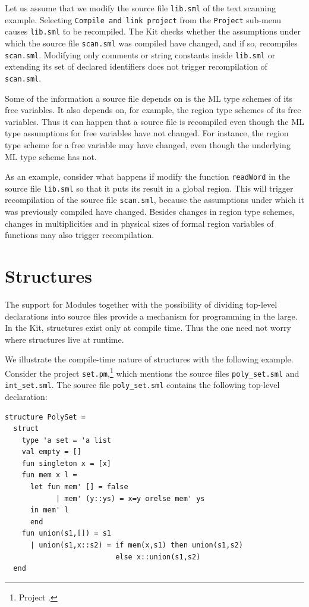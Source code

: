 \documentclass[12pt]{book}
\begin{document}
Let us assume that we modify the source file {\tt lib.sml} of the
text scanning example.  Selecting {\tt Compile and link project} from
the {\tt Project} sub-menu  causes {\tt lib.sml} to be recompiled.
The Kit checks whether the assumptions under which the source
file {\tt scan.sml} was compiled have changed, and if so, recompiles 
{\tt scan.sml}.  Modifying only comments or string constants inside
{\tt lib.sml} or extending its set of declared identifiers does not
trigger recompilation of {\tt scan.sml}.  

Some of the information a source file depends on is the ML type
schemes of its free variables. It also depends on, for example, 
the region type schemes of its free variables. 
Thus it can happen that a source file is
recompiled even though the ML type assumptions for free variables have
not changed. For instance, the region type scheme for a free variable
may have changed, even though the underlying ML type scheme has not.

As an example, consider what happens if modify the function {\tt readWord} in the
source file {\tt lib.sml} so that it puts its result in a global region. This
will trigger recompilation of the source file {\tt scan.sml}, because
the assumptions under which it was previously compiled have
changed. Besides changes in region type schemes, changes in
multiplicities and in physical sizes of formal region variables of
functions may also trigger recompilation.


\section{Structures}
The support for Modules together with the possibility of dividing top-level
declarations into source files provide a mechanism for
programming in the large. In the Kit, structures exist only at compile
time. 
Thus the one need not worry where
structures live at runtime.

We illustrate the compile-time nature of structures with the following
example. Consider the project {\tt set.pm},\footnote{Project
  .} which mentions the source files {\tt poly\_set.sml} and {\tt int\_set.sml}. The source
  file {\tt poly\_set.sml} contains the following top-level
  declaration:
\begin{verbatim}
structure PolySet = 
  struct
    type 'a set = 'a list
    val empty = []
    fun singleton x = [x]
    fun mem x l = 
      let fun mem' [] = false
            | mem' (y::ys) = x=y orelse mem' ys 
      in mem' l
      end
    fun union(s1,[]) = s1
      | union(s1,x::s2) = if mem(x,s1) then union(s1,s2)
                          else x::union(s1,s2)  
  end
\end{verbatim}
\end{document}
